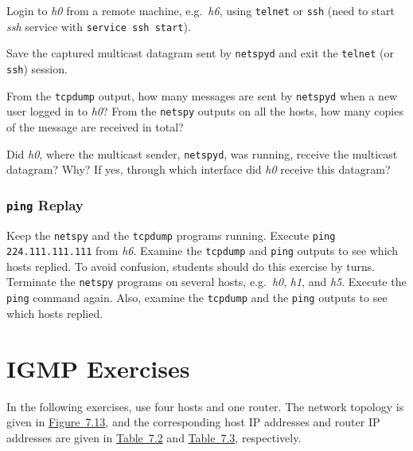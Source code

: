\documentclass{../UTNetLab}
\begin{document}
    Login to \textit{h0} from a remote machine, e.g.\ \textit{h6}, using \lstinline{telnet} or \lstinline{ssh} (need to start \textit{ssh} service with \lstinline{service ssh start}).

    Save the captured multicast datagram sent by \lstinline{netspyd} and exit the \lstinline{telnet} (or \lstinline{ssh}) session.

    \begin{report}
        \item From the \lstinline{tcpdump} output, how many messages are sent by \lstinline{netspyd} when a new user logged in to \textit{h0}?
            From the \lstinline{netspy} outputs on all the hosts, how many copies of the message are received in total?

        \item Did \textit{h0}, where the multicast sender, \lstinline{netspyd}, was running, receive the multicast datagram?
            Why?
            If yes, through which interface did \textit{h0} receive this datagram?
    \end{report}

\section{\texttt{ping} Replay}
    Keep the \lstinline{netspy} and the \lstinline{tcpdump} programs running.
    Execute \lstinline{ping 224.111.111.111} from \textit{h6}.
    Examine the \lstinline{tcpdump} and \lstinline{ping} outputs to see which hosts replied.
    To avoid confusion, students should do this exercise by turns.
    Terminate the \lstinline{netspy} programs on several hosts, e.g.\ \textit{h0}, \textit{h1}, and \textit{h5}.
    Execute the \lstinline{ping} command again.
    Also, examine the \lstinline{tcpdump} and the \lstinline{ping} outputs to see which hosts replied.

\part{IGMP Exercises}\label{sec:igmp}
    In the following exercises, use four hosts and one router.
    The network topology is given in \hyperref[fig:7.13]{Figure~7.13}, and the corresponding host IP addresses and router IP addresses are given in \hyperref[tab:7.2]{Table~7.2} and \hyperref[tab:7.3]{Table~7.3}, respectively.
\end{document}
